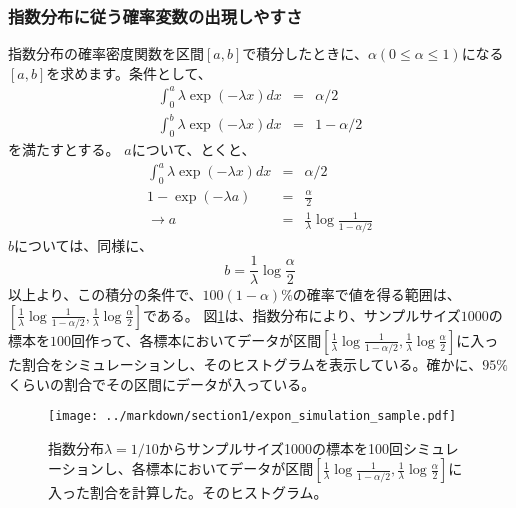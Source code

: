 \documentclass[a4paper,11pt,dvipdfmx]{jsarticle}
\begin{document}
\subsubsection{指数分布に従う確率変数の出現しやすさ}
指数分布の確率密度関数を区間$[a,b]$で積分したときに、$\alpha(0\leq \alpha \leq 1)$になる$[a,b]$を求めます。条件として、
\begin{eqnarray*}
    \int_0^{a}  \lambda\exp(-\lambda x )dx &=& \alpha/2\\
    \int_0^{b} \lambda\exp(-\lambda x )dx &=& 1-\alpha/2
\end{eqnarray*}
を満たすとする。
$a$について、とくと、
\begin{eqnarray*}
    \int_0^{a}  \lambda\exp(-\lambda x )dx &=& \alpha/2\\
     1-\exp(-\lambda a) &=& \frac{\alpha}{2}\\
     \rightarrow a&=& \frac{1}{\lambda} \log\frac{1}{1-\alpha/2}
\end{eqnarray*}
$b$については、同様に、
\begin{equation*}
    b = \frac{1}{\lambda}\log\frac{\alpha}{2}
\end{equation*}
以上より、この積分の条件で、$100(1-\alpha)\%$の確率で値を得る範囲は、$[\frac{1}{\lambda} \log\frac{1}{1-\alpha/2} ,\frac{1}{\lambda}\log\frac{\alpha}{2}]$である。
図\ref{fig:expon_simulation_sample}は、指数分布により、サンプルサイズ$1000$の標本を$100$回作って、各標本においてデータが区間$[\frac{1}{\lambda} \log\frac{1}{1-\alpha/2} ,\frac{1}{\lambda}\log\frac{\alpha}{2}]$に入った割合をシミュレーションし、そのヒストグラムを表示している。確かに、$95\%$くらいの割合でその区間にデータが入っている。


\begin{figure}
    \begin{center}
        \texttt{[image: ../markdown/section1/expon\_simulation\_sample.pdf]}
        \caption{指数分布$\lambda=1/10$からサンプルサイズ1000の標本を100回シミュレーションし、各標本においてデータが区間$[\frac{1}{\lambda} \log\frac{1}{1-\alpha/2} ,\frac{1}{\lambda}\log\frac{\alpha}{2}]$に入った割合を計算した。そのヒストグラム。}
        \label{fig:expon_simulation_sample}

    \end{center}
\end{figure}
\end{document}
